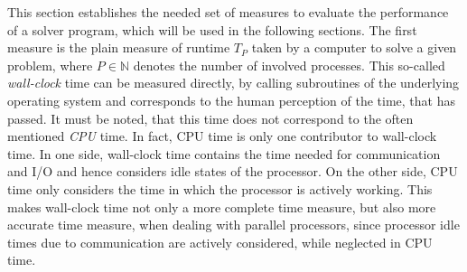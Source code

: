 This section establishes the needed set of measures to evaluate the performance of a solver program, which will be used in the following sections. The first measure is the plain measure of runtime \(T_P\) taken by a computer to solve a given problem, where \(P \in \mathbb{N}\) denotes the number of involved processes. This so-called \emph{wall-clock} time can be measured directly, by calling subroutines of the underlying operating system and corresponds to the human perception of the time, that has passed. It must be noted, that this time does not correspond to the often mentioned \emph{CPU} time. In fact, CPU time is only one contributor to wall-clock time. In one side, wall-clock time contains the time needed for communication and I/O and hence considers idle states of the processor. On the other side, CPU time only considers the time in which the processor is actively working. This makes wall-clock time not only a more complete time measure, but also more accurate time measure, when dealing with parallel processors, since processor idle times due to communication are actively considered, while neglected in CPU time.


